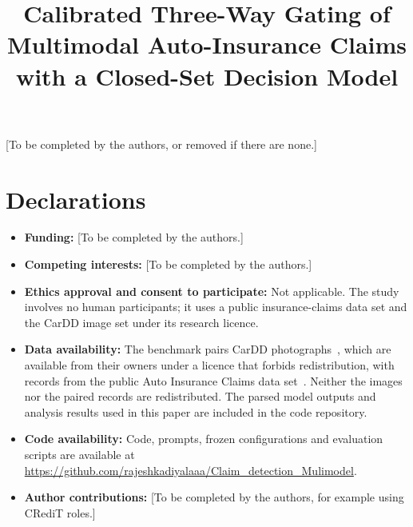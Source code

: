 \documentclass[pdflatex,sn-mathphys-num]{sn-jnl}
\begin{document}
\title[Calibrated Three-Way Gating of Multimodal Auto-Insurance Claims]{Calibrated Three-Way Gating of Multimodal Auto-Insurance Claims with a Closed-Set Decision Model}

\author*[1]{ }

\author[1]{ }

\author[1]{ }





\maketitle







\backmatter

[To be completed by the authors, or removed if there are none.]

\section*{Declarations}
\begin{itemize}
\item \textbf{Funding:} [To be completed by the authors.]
\item \textbf{Competing interests:} [To be completed by the authors.]
\item \textbf{Ethics approval and consent to participate:} Not applicable. The study involves no human participants; it uses a public insurance-claims data set and the CarDD image set under its research licence.
\item \textbf{Data availability:} The benchmark pairs CarDD photographs~\cite{wang2023cardd}, which are available from their owners under a licence that forbids redistribution, with records from the public Auto Insurance Claims data set~\cite{kaggleclaims}. Neither the images nor the paired records are redistributed. The parsed model outputs and analysis results used in this paper are included in the code repository.
\item \textbf{Code availability:} Code, prompts, frozen configurations and evaluation scripts are available at \url{https://github.com/rajeshkadiyalaaa/Claim_detection_Mulimodel}.
\item \textbf{Author contributions:} [To be completed by the authors, for example using CRediT roles.]
\end{itemize}


\end{document}
